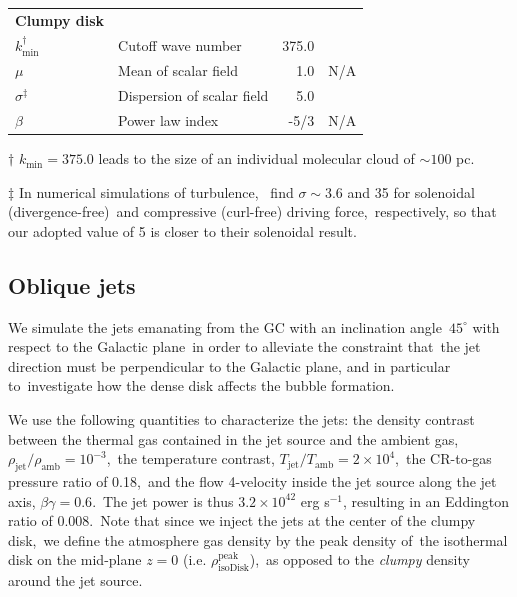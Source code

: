 \documentclass[fleqn,usenatbib,useAMS]{mnras}
\begin{document}
\begin{table}
\begin{tabular}{@{}llrc@{}}
{\bf Clumpy disk }                    &                                &                                      &                                \\
$k_{\text{min}}^\dagger$            & Cutoff wave number             & 375.0                                & \citep{peak-ism-density}       \\
$\mu$                                 & Mean of scalar field           & 1.0                                  &   N/A                          \\
$\sigma^\ddag$                 & Dispersion of scalar field     & 5.0                                  & \citep{Federrath2010}          \\
$\beta$                               & Power law index                & -5/3                                 &   N/A                          \\ \midrule
\end{tabular}
\begin{tablenotes}
      \raggedright
      \item  $\dagger$  $k_{\text{min}}=375.0$ leads to the size of an individual molecular cloud of $\sim 100$ pc.
      \item  $\ddag$ In numerical simulations of turbulence,\
             \citet{Federrath2010} find $\sigma\sim 3.6$ and 35 for solenoidal (divergence-free)\
             and compressive (curl-free) driving force,\
             respectively, so that our adopted value of 5 is closer to their solenoidal result.
    \end{tablenotes}
\end{table}

%

\subsection{Oblique jets}

  We simulate the jets emanating from the GC with an inclination angle\
  $45^{\circ}$ with respect to the Galactic plane\
  in order to alleviate the constraint that\
  the jet direction must be perpendicular to the Galactic plane, and in particular to\
  investigate how the dense disk affects the bubble formation.


  We use the following quantities to characterize the jets:
  the density contrast between the thermal gas contained in the jet source and the ambient gas,\
  $\rho_{\text{jet}}/\rho_{\text{amb}}=10^{-3}$,\
  the temperature contrast, $T_{\text{jet}}/T_{\text{amb}}=2\times10^{4}$,\
  the CR-to-gas pressure ratio of 0.18,\
  and the flow 4-velocity inside the jet source along the jet axis, $\beta\gamma = 0.6$.\
  The jet power is thus $3.2\times 10^{42}$ erg s$^{-1}$, resulting in an Eddington ratio of 0.008.\
  Note that since we inject the jets at the center of the clumpy disk,\
  we define the atmosphere gas density by the peak density of\
  the isothermal disk on the mid-plane $z=0$ (i.e. $\rho^{\text{peak}}_{\text{isoDisk}}$),\
  as opposed to the \textit{clumpy} density around the jet source.
\end{document}
